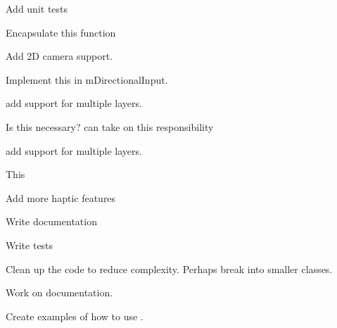 \begin{DoxyRefList}
Add unit tests 
\item[Member \doxylink{class_atlas_1_1_file_system_registry_a09591b2eeacb6c7b5aa460780be9a26f}{Atlas\+::File\+System\+Registry\+::init} (const char \texorpdfstring{$\ast$}{*}root\+Path)]\label{todo__todo000008}%
%
Encapsulate this function  
\item[Class \doxylink{class_atlas_1_1_game_camera}{Atlas\+::Game\+Camera} ]\label{todo__todo000016}%
%
Add 2D camera support.  
\item[Class \doxylink{class_atlas_1_1_game_camera_1_1_directional_input}{Atlas\+::Game\+Camera\+::Directional\+Input} ]\label{todo__todo000017}%
%
Implement this in m\+Directional\+Input.  
\item[Class \doxylink{class_atlas_1_1_i_game_object}{Atlas\+::IGame\+Object} ]\label{todo__todo000011}%
%
add support for multiple layers.  
\item[Member \doxylink{class_atlas_1_1_i_game_object_aadb8ac4a4ee34905fb156c41929f24f6}{Atlas\+::IGame\+Object\+::cleanup} ()=0]\label{todo__todo000013}%
%
Is this necessary?  can take on this responsibility  
\item[Member \doxylink{class_atlas_1_1_i_game_object_a0001128436e3b2402a682785f7fd8463}{Atlas\+::IGame\+Object\+::depth} ]\label{todo__todo000012}%
%
add support for multiple layers.  
\item[Class \doxylink{class_atlas_1_1_localization_registry}{Atlas\+::Localization\+Registry} ]\label{todo__todo000010}%
%
This  
\item[\doxylink{class_atlas_1_1_file}{File} \doxylink{_common_8h}{Common.h} ]\label{todo__todo000002}%
%
Add more haptic features 
\item[\doxylink{class_atlas_1_1_file}{File} \doxylink{_file_system_registry_8h}{File\+System\+Registry.h} ]\label{todo__todo000006}%
%
Write documentation 



Write tests 



Clean up the code to reduce complexity. Perhaps break into smaller classes.  
\item[\doxylink{class_atlas_1_1_file}{File} \doxylink{_game_camera_8h}{Game\+Camera.h} ]\label{todo__todo000015}%
%
Work on documentation.  
\item[\doxylink{class_atlas_1_1_file}{File} \doxylink{_input_8h}{Input.h} ]\label{todo__todo000009}%
%
Create examples of how to use . 




\end{DoxyRefList}
